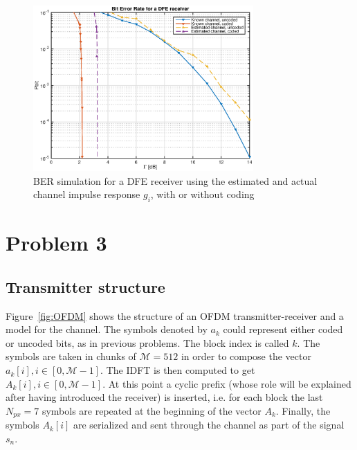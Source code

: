 \documentclass[10pt]{article}
\newcommand{\ofdM} {\mathcal{M}}
\begin{document}

\begin{figure}[h!]
	\centering
	\includegraphics[width = 0.75\textwidth]{problem2}
	\caption{BER simulation for a DFE receiver using the estimated and actual channel impulse response $g_i$, with or without coding}
	\label{fig:problem2_pbit}
\end{figure}

\section*{Problem 3}

\subsection*{Transmitter structure}
Figure~\ref{fig:OFDM} shows the structure of an OFDM transmitter-receiver and a model for the channel. The symbols denoted by $a_k$ could represent either coded or uncoded bits, as in previous problems. The block index is called $k$. The symbols are taken in chunks of $\ofdM = 512$ in order to compose the vector $a_k[i], i \in [0, \ofdM - 1]$. The IDFT is then computed to get $A_k[i], i\in [0, \ofdM-1]$. At this point a cyclic prefix (whose role will be explained after having introduced the receiver) is inserted, i.e. for each block the last $N_{px} = 7$ symbols are repeated at the beginning of the vector $A_k$. Finally, the symbols $A_k[i]$ are serialized and sent through the channel as part of the signal $s_n$.
\end{document}
